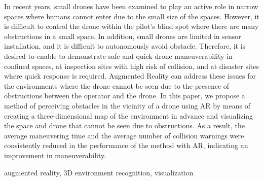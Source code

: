 \documentclass[submit, sigrecommended]{ipsj}
\begin{document}
\begin{eabstract}
In recent years, small drones have been examined to play an active role in narrow spaces where humans cannot enter due to the small size of the spaces. 
However, it is difficult to control the drone within the pilot’s blind spot where there are many obstructions in a small space. 
In addition, small drones are limited in sensor installation, and it is difficult to autonomously avoid obstacle. 
Therefore, it is desired to enable to demonstrate safe and quick drone maneuverability in confined spaces, at inspection sites with high risk of collision, and at disaster sites where quick response is required.
Augmented Reality can address these issues for the environments where the drone cannot be seen due to the presence of obstructions between the operator and the drone. 
In this paper, we propose a method of perceiving obstacles in the vicinity of a drone using AR by means of creating a three-dimensional map of the environment in advance and visualizing the space and drone that cannot be seen due to obstructions. As a result, the average maneuvering time and the average number of collision warnings were consistently reduced in the performance of the method with AR, indicating an improvement in maneuverability.
\end{eabstract}

\begin{ekeyword}
augmented reality, 3D environment recognition, visualization
\end{ekeyword}

\maketitle

\end{document}
